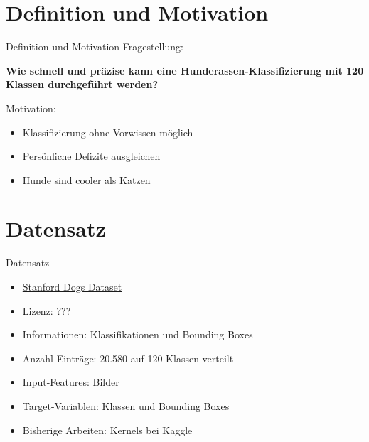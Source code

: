 


\maketitle
  \section{Definition und Motivation}
  \begin{frame}{Definition und Motivation}
    Fragestellung:
    \begin{center}
      \textbf{Wie schnell und präzise kann eine Hunderassen-Klassifizierung mit 120 Klassen
      durchgeführt werden?}
    \end{center}
    Motivation:
    \begin{itemize}\setlength\itemsep{1em}
      \item Klassifizierung ohne Vorwissen möglich
      \item Persönliche Defizite ausgleichen
      \item Hunde sind cooler als Katzen
    \end{itemize}
  \end{frame}
  \section{Datensatz}
  \begin{frame}{Datensatz}
    \begin{itemize}\setlength\itemsep{1em}
      \item \href{https://www.kaggle.com/jessicali9530/stanford-dogs-dataset}{Stanford Dogs Dataset}
      \item Lizenz: ???
      \item Informationen: Klassifikationen und Bounding Boxes
      \item Anzahl Einträge: 20.580 auf 120 Klassen verteilt
      \item Input-Features: Bilder
      \item Target-Variablen: Klassen und Bounding Boxes
      \item Bisherige Arbeiten: Kernels bei Kaggle
    \end{itemize}
  \end{frame}

